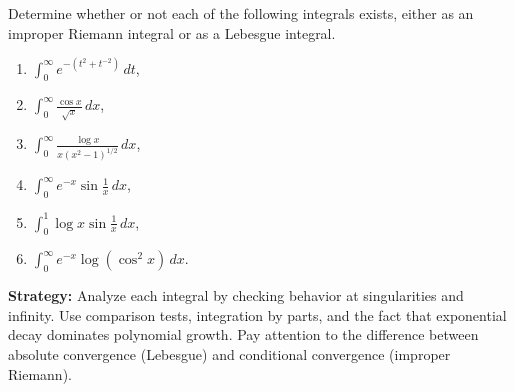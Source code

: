 \begin{problembox}
\begin{problemstatement}
Determine whether or not each of the following integrals exists, either as an improper Riemann integral or as a Lebesgue integral.
\begin{enumerate}[label=(\alph*)]
\item $\int_{0}^{\infty} e^{-(t^2 + t^{-2})} \, dt$,
\item $\int_{0}^{\infty} \frac{\cos x}{\sqrt{x}} \, dx$,
\item $\int_{0}^{\infty} \frac{\log x}{x(x^2 - 1)^{1/2}} \, dx$,
\item $\int_{0}^{\infty} e^{-x} \sin \frac{1}{x} \, dx$,
\item $\int_{0}^{1} \log x \sin \frac{1}{x} \, dx$,
\item $\int_{0}^{\infty} e^{-x} \log (\cos^2 x) \, dx$.
\end{enumerate}
\end{problemstatement}
\end{problembox}

\noindent\textbf{Strategy:} Analyze each integral by checking behavior at singularities and infinity. Use comparison tests, integration by parts, and the fact that exponential decay dominates polynomial growth. Pay attention to the difference between absolute convergence (Lebesgue) and conditional convergence (improper Riemann).

